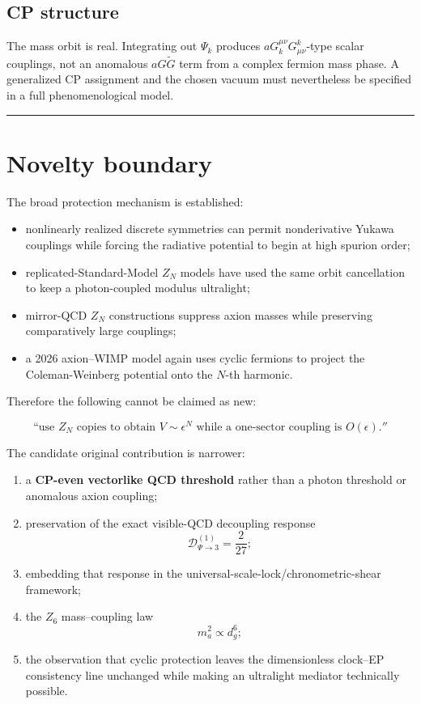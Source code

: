 \documentclass[11pt,a4paper]{article}
\providecommand{\tightlist}{\setlength{\itemsep}{0pt}\setlength{\parskip}{0pt}}
\begin{document}
\subsection{CP structure}\label{cp-structure}

The mass orbit is real. Integrating out \(\Psi_k\) produces
\(aG_k^{\mu\nu}G^k_{\mu\nu}\)-type scalar couplings, not an anomalous
\(aG\widetilde G\) term from a complex fermion mass phase. A generalized
CP assignment and the chosen vacuum must nevertheless be specified in a
full phenomenological model.

\begin{center}\rule{0.5\linewidth}{0.5pt}\end{center}

\section{Novelty boundary}\label{novelty-boundary}

The broad protection mechanism is established:

\begin{itemize}
\tightlist
\item
  nonlinearly realized discrete symmetries can permit nonderivative
  Yukawa couplings while forcing the radiative potential to begin at
  high spurion order;
\item
  replicated-Standard-Model \(Z_N\) models have used the same orbit
  cancellation to keep a photon-coupled modulus ultralight;
\item
  mirror-QCD \(Z_N\) constructions suppress axion masses while
  preserving comparatively large couplings;
\item
  a 2026 axion--WIMP model again uses cyclic fermions to project the
  Coleman-Weinberg potential onto the \(N\)-th harmonic.
\end{itemize}

Therefore the following cannot be claimed as new:

\[
\text{``use }Z_N\text{ copies to obtain }V\sim\epsilon^N\text{ while a one-sector coupling is }O(\epsilon).''
\]

The candidate original contribution is narrower:

\begin{enumerate}
\def\labelenumi{\arabic{enumi}.}
\tightlist
\item
  a \textbf{CP-even vectorlike QCD threshold} rather than a photon
  threshold or anomalous axion coupling;
\item
  preservation of the exact visible-QCD decoupling response \[
  \mathcal D_{\Psi\to3}^{(1)}=\frac{2}{27};
  \]
\item
  embedding that response in the universal-scale-lock/chronometric-shear
  framework;
\item
  the \(Z_6\) mass--coupling law \[
  m_a^2\propto d_g^6;
  \]
\item
  the observation that cyclic protection leaves the dimensionless
  clock--EP consistency line unchanged while making an ultralight
  mediator technically possible.
\end{enumerate}
\end{document}
